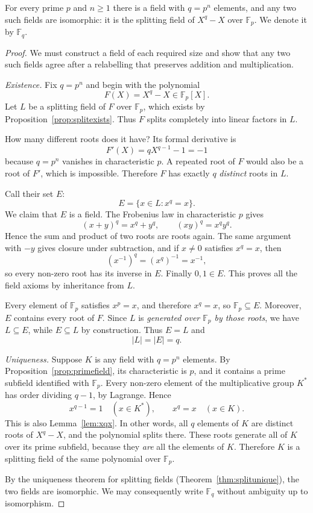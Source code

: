 \begin{theorem}\label{thm:fq}
For every prime $p$ and $n\ge1$ there is a field with $q=p^n$ elements, and any two such fields are isomorphic: it is the splitting field of $X^q-X$ over $\mathbb F_p$. We denote it by $\mathbb F_q$.
\end{theorem}
\begin{proof}
We must construct a field of each required size and show that any two such
fields agree after a relabelling that preserves addition and multiplication.

\emph{Existence.} Fix $q=p^n$ and begin with the polynomial
\[
F(X)=X^q-X\in\mathbb F_p[X].
\]
Let $L$ be a splitting field of $F$ over $\mathbb F_p$, which exists by Proposition~\ref{prop:splitexists}. Thus $F$ splits completely into linear factors in $L$.

How many different roots does it have? Its formal derivative is
\[
F'(X)=qX^{q-1}-1=-1
\]
because $q=p^n$ vanishes in characteristic $p$. A repeated root of $F$ would also be a root of $F'$, which is impossible. Therefore $F$ has exactly $q$ \emph{distinct} roots in $L$.

Call their set $E$:
\[
E=\{x\in L:x^q=x\}.
\]
We claim that $E$ is a field. The Frobenius law in characteristic $p$ gives
\[
(x+y)^q=x^q+y^q,\qquad (xy)^q=x^qy^q.
\]
Hence the sum and product of two roots are roots again. The same argument with $-y$ gives closure under subtraction, and if $x\ne0$ satisfies $x^q=x$, then
\[
(x^{-1})^q=(x^q)^{-1}=x^{-1},
\]
so every non-zero root has its inverse in $E$. Finally $0,1\in E$. This proves all the field axioms by inheritance from $L$.

Every element of $\mathbb F_p$ satisfies $x^p=x$, and therefore $x^q=x$, so $\mathbb F_p\subseteq E$. Moreover, $E$ contains every root of $F$. Since $L$ is \emph{generated over $\mathbb F_p$ by those roots}, we have $L\subseteq E$, while $E\subseteq L$ by construction. Thus $E=L$ and
\[
|L|=|E|=q.
\]

\emph{Uniqueness.} Suppose $K$ is any field with $q=p^n$ elements. By Proposition~\ref{prop:primefield}, its characteristic is $p$, and it contains a prime subfield identified with $\mathbb F_p$. Every non-zero element of the multiplicative group $K^*$ has order dividing $q-1$, by Lagrange. Hence
\[
x^{q-1}=1\quad(x\in K^*),\qquad x^q=x\quad(x\in K).
\]
This is also Lemma~\ref{lem:xqx}. In other words, all $q$ elements of $K$ are distinct roots of $X^q-X$, and the polynomial splits there. These roots generate all of $K$ over its prime subfield, because they \emph{are} all the elements of $K$. Therefore $K$ is a splitting field of the same polynomial over $\mathbb F_p$.

By the uniqueness theorem for splitting fields (Theorem~\ref{thm:splitunique}), the two fields are isomorphic. We may consequently write $\mathbb F_q$ without ambiguity up to isomorphism.
\end{proof}


